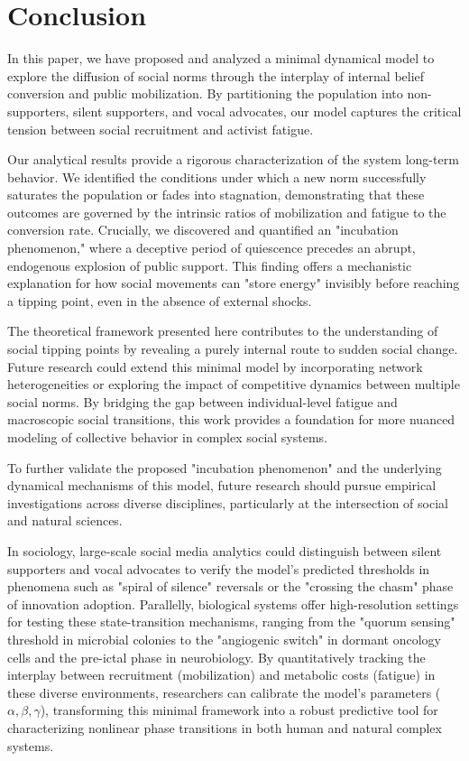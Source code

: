 \documentclass{article}
\begin{document}
\section{Conclusion}\label{sec:conclusion}

In this paper, we have proposed and analyzed a minimal dynamical model to explore the diffusion of social norms through the interplay of internal belief conversion and public  mobilization. By partitioning the population into non-supporters, silent supporters, and vocal advocates, our model captures the critical tension between social recruitment and activist fatigue. 

Our analytical results provide a rigorous characterization of the system long-term behavior. We identified the conditions under which a new norm successfully saturates the population or fades into stagnation, demonstrating that these outcomes are governed by the intrinsic ratios of mobilization and fatigue to the conversion rate. Crucially, we discovered and quantified an "incubation phenomenon," where a deceptive period of quiescence precedes an abrupt, endogenous explosion of public support. This finding offers a mechanistic explanation for how social movements can "store energy" invisibly before reaching a tipping point, even in the absence of external shocks. 

The theoretical framework presented here contributes to the understanding of social tipping points by revealing a purely internal route to sudden social change.  Future research could extend this minimal model by incorporating network heterogeneities or exploring the impact of competitive dynamics between multiple social norms. By bridging the gap between individual-level fatigue and macroscopic social transitions, this work provides a foundation for more nuanced modeling of collective behavior in complex social systems.

To further validate the proposed "incubation phenomenon" and the underlying dynamical mechanisms of this model, future research should pursue empirical investigations across diverse disciplines, particularly at the intersection of social and natural sciences.

In sociology, large-scale social media analytics could distinguish between silent supporters and vocal advocates to verify the model's predicted thresholds in phenomena such as "spiral of silence" reversals or the "crossing the chasm" phase of innovation adoption. Parallelly, biological systems offer high-resolution settings for testing these state-transition mechanisms, ranging from the "quorum sensing" threshold in microbial colonies to the "angiogenic switch" in dormant oncology cells and the pre-ictal phase in neurobiology. By quantitatively tracking the interplay between recruitment (mobilization) and metabolic costs (fatigue) in these diverse environments, researchers can calibrate the model's parameters ($\alpha, \beta, \gamma$), transforming this minimal framework into a robust predictive tool for characterizing nonlinear phase transitions in both human and natural complex systems.
\end{document}
